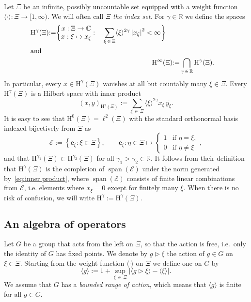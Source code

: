 \documentclass[AHL,Unicode,longabstracts,published]{cedram}
\DeclareMathOperator{\spann}{span}
\newcommand{\RH}{\mathrm{H}}
\newcommand{\R}{\mathbb R}
\newcommand{\C}{\mathbb C}
\newcommand{\CE}{\mathcal{E}}
\newcommand{\be}{\mathbf e}
\newcommand{\act}{\triangleright}
\newcommand{\abs}[1]{\left\lvert #1 \right\rvert}
\newcommand{\ang}[1]{\langle #1 \rangle}
\begin{document}
Let $\Xi$ be an infinite, possibly uncountable set equipped with a weight function $\ang \cdot : \Xi \to [1,\infty)$. We will often call $\Xi$ {\emph {the index set}}. For $\gamma \in \R$ we define the spaces
\begin{align}
\begin{split} \RH^{\gamma}(\Xi) &{:=} \bigg\{
\begin{matrix}x: \Xi \to \C\\ \displaystyle x:\xi\mapsto x_\xi
\end{matrix}:\quad \sum_{\xi\,\in\,\Xi}\ang{\xi}^{2\gamma}\abs{x_\xi}^2 < \infty\bigg\}
\end{split}
\\
\intertext{and}
{\RH}^\infty(\Xi) &{:=}\bigcap\limits_{\gamma\,\in\,\R}{\RH}^\gamma(\Xi).
\end{align}
In particular, every $x\in \RH^{\gamma}(\Xi)$ vanishes at all but countably many $\xi\in\Xi$. Every $\RH^{\gamma}(\Xi)$ is a Hilbert space with inner product
\begin{equation}\label{eq:inner product}
\left(x,y \right)_{\RH^\gamma(\Xi)} := \sum_{\xi\,\in\,\Xi}\ang{\xi}^{2\gamma}x_\xi\,\overline{y_\xi}.
\end{equation}
It is easy to see that $\RH^0(\Xi) = \ell^2(\Xi)$ with the standard orthonormal basis indexed bijectively from $\Xi$ as
\begin{equation}
\CE := \left\{\be_{\xi}: \xi \in \Xi\right\}, \qquad \be_{\xi} :\eta\in\Xi\mapsto
\begin{cases}
1 & \text{if }\eta =\xi,\\ 0 & \text{if }\eta\neq\xi
\end{cases},
\end{equation}
and that $\RH^{\gamma_1}(\Xi) \subset \RH^{\gamma_2}(\Xi)$ for all $\gamma_1 >\gamma_2\in\R$. It follows from their definition that $\RH^\gamma(\Xi)$ is the completion of $\spann(\CE)$ under the norm generated by~\eqref{eq:inner product}, where $\spann(\CE)$ consists of finite linear combinations from $\CE$, i.e. elements where $x_\xi = 0$ except for finitely many $\xi$. When there is no risk of confusion, we will write $\RH^\gamma:=\RH^\gamma(\Xi)$.

\subsection{An algebra of operators}

Let $G$ be a group that acts from the left on $\Xi$, so that the action is free, i.e.~only the identity of $G$ has fixed points. We denote by $g\act \xi$ the action of $g\in G$ on $\xi\in\Xi$. Starting from the weight function $\langle\cdot\rangle$ on $\Xi$ we define one on $G$ by
\begin{equation}\label{eq:modulusg}
\ang g := 1 + \sup_{\xi\,\in\,\Xi} \left|\ang{g\act\xi} - \ang{\xi}\right|.
\end{equation}
We assume that $G$ has a \emph{bounded range of action}, which means that $\ang g$ is finite for all $g\in G$.
\end{document}
